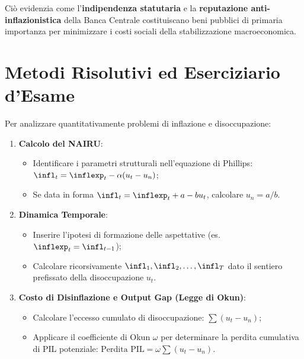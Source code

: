 Ciò evidenzia come l'\textbf{indipendenza statutaria} e la \textbf{reputazione anti-inflazionistica} della Banca Centrale costituiscano beni pubblici di primaria importanza per minimizzare i costi sociali della stabilizzazione macroeconomica.

\section{Metodi Risolutivi ed Eserciziario d'Esame}

\begin{metodo}
Per analizzare quantitativamente problemi di inflazione e disoccupazione:
\begin{enumerate}
    \item \textbf{Calcolo del NAIRU}:
    \begin{itemize}
        \item Identificare i parametri strutturali nell'equazione di Phillips: $\infl_t = \inflexp_t - \alpha(u_t - u_n)$;
        \item Se data in forma $\infl_t = \inflexp_t + a - b u_t$, calcolare $u_n = a/b$.
    \end{itemize}
    \item \textbf{Dinamica Temporale}:
    \begin{itemize}
        \item Inserire l'ipotesi di formazione delle aspettative (es. $\inflexp_t = \infl_{t-1}$);
        \item Calcolare ricorsivamente $\infl_1, \infl_2, \dots, \infl_T$ dato il sentiero prefissato della disoccupazione $u_t$.
    \end{itemize}
    \item \textbf{Costo di Disinflazione e Output Gap (Legge di Okun)}:
    \begin{itemize}
        \item Calcolare l'eccesso cumulato di disoccupazione: $\sum (u_t - u_n)$;
        \item Applicare il coefficiente di Okun $\omega$ per determinare la perdita cumulativa di PIL potenziale: $\text{Perdita PIL} = \omega \sum (u_t - u_n)$.
    \end{itemize}
\end{enumerate}
\end{metodo}

